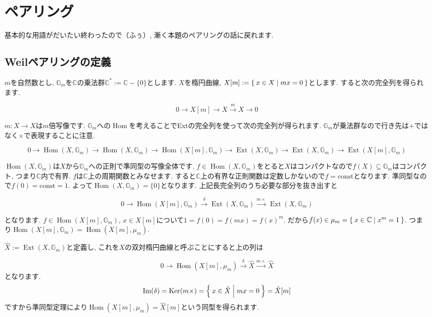\documentclass{jsarticle}
\newcommand{\CC}{\mathbb{C}}
\newcommand{\GG}{\mathbb{G}}
\newcommand{\makeop}[1]{\mathop{\mathrm{#1}}\nolimits}
\def\Im{\makeop{Im}}
\def\Ker{\makeop{Ker}}
\def\Hom{\makeop{Hom}}
\def\Ext{\makeop{Ext}}
\theoremstyle{definition}
\numberwithin{theorem}{section}
\begin{document}
\section{ペアリング}
基本的な用語がだいたい終わったので（ふぅ）, 漸く本題のペアリングの話に戻れます.

\subsection{Weilペアリングの定義}

$m$を自然数とし, $\GG_m$を$\CC$の乗法群$\CC^* := \CC - \{0\}$とします. $X$を楕円曲線, $X[m] := \Set{x \in X | mx = 0}$とします. すると次の完全列を得られます.

\begin{equation*}
0 \rightarrow X[m] \rightarrow X \xrightarrow{m} X \rightarrow 0
\end{equation*}

$m : X \rightarrow X$は$m$倍写像です. $\GG_m$への$\Hom$を考えることでExtの完全列を使って次の完全列が得られます.
$\GG_m$が乗法群なので行き先は$+$ではなく$\times$で表現することに注意.

\begin{equation*}
0 \rightarrow \Hom(X, \GG_m) \rightarrow \Hom(X, \GG_m) \rightarrow \Hom(X[m], \GG_m) \rightarrow \Ext(X, \GG_m) \rightarrow \Ext(X, \GG_m) \rightarrow \Ext(X[m], \GG_m)
\end{equation*}

$\Hom(X, \GG_m)$は$X$から$\GG_m$への正則で準同型の写像全体です.
$f\in\Hom(X, \GG_m)$をとると$X$はコンパクトなので$f(X) \subseteq\GG_m$はコンパクト, つまり$\CC$内で有界. $f$は$\CC$上の周期関数とみなせます. すると$\CC$上の有界な正則関数は定数しかないので$f = \mathrm{const}$となります. 準同型なので$f(0) = \mathrm{const} = 1$. よって$\Hom(X, \GG_m) = \{0\}$となります. 上記長完全列のうち必要な部分を抜き出すと

\begin{equation*}
0 \rightarrow \Hom(X[m], \GG_m) \xrightarrow{\delta} \Ext(X, \GG_m) \xrightarrow{m\times} \Ext(X, \GG_m)
\end{equation*}

となります. $f \in \Hom(X[m], \GG_m)$, $x \in X[m]$について$1 = f(0) = f(mx) = f(x)^m$. だから$f(x) \in \mu_m = \Set{x \in \CC | x^m = 1}$. つまり$\Hom(X[m], \GG_m) = \Hom(X[m], \mu_m)$.

$\hat{X} := \Ext(X, \GG_m)$と定義し, これを$X$の双対楕円曲線と呼ぶことにすると上の列は

\begin{equation*}
0 \rightarrow \Hom(X[m], \mu_m) \xrightarrow{\delta} \hat{X} \xrightarrow{m\times} \hat{X}
\end{equation*}
となります.
\[
\Im(\delta) = \Ker(m\times) = \Set{x \in \hat{X} | mx = 0} = \hat{X}[m]
\]
ですから準同型定理により$\Hom(X[m], \mu_m) = \hat{X}[m]$という同型を得られます.
\end{document}
